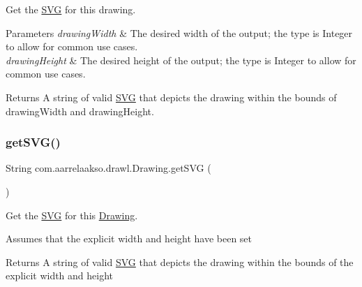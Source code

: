 Get the \hyperlink{classcom_1_1aarrelaakso_1_1drawl_1_1_s_v_g}{S\+VG} for this drawing. 


\begin{DoxyParams}{Parameters}
{\em drawing\+Width} & The desired width of the output; the type is Integer to allow for common use cases. \\
\hline
{\em drawing\+Height} & The desired height of the output; the type is Integer to allow for common use cases. \\
\hline
\end{DoxyParams}
\begin{DoxyReturn}{Returns}
A string of valid \hyperlink{classcom_1_1aarrelaakso_1_1drawl_1_1_s_v_g}{S\+VG} that depicts the drawing within the bounds of drawing\+Width and drawing\+Height. 
\end{DoxyReturn}
\mbox{\label{classcom_1_1aarrelaakso_1_1drawl_1_1_drawing_ae49bfdabbf7177b244a7a0b5ae995fe1}} 
\subsubsection{\texorpdfstring{get\+S\+V\+G()}{getSVG()}\hspace{0.1cm}{\footnotesize\ttfamily [3/3]}}
{\footnotesize\ttfamily String com.\+aarrelaakso.\+drawl.\+Drawing.\+get\+S\+VG (\begin{DoxyParamCaption}{ }\end{DoxyParamCaption})}



Get the \hyperlink{classcom_1_1aarrelaakso_1_1drawl_1_1_s_v_g}{S\+VG} for this \hyperlink{classcom_1_1aarrelaakso_1_1drawl_1_1_drawing}{Drawing}. 

Assumes that the explicit width and height have been set

\begin{DoxyReturn}{Returns}
A string of valid \hyperlink{classcom_1_1aarrelaakso_1_1drawl_1_1_s_v_g}{S\+VG} that depicts the drawing within the bounds of the explicit width and height 
\end{DoxyReturn}
\mbox{\label{classcom_1_1aarrelaakso_1_1drawl_1_1_drawing_ab5e45e49b01dc01733156f2bd3e917ea}} 
